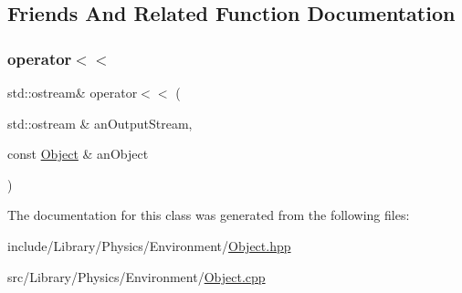 \subsection{Friends And Related Function Documentation}
\mbox{\label{classlibrary_1_1physics_1_1env_1_1_object_a418df9bf4a73078f3d494edef1743f8d}} 
\subsubsection{\texorpdfstring{operator$<$$<$}{operator<<}}
{\footnotesize\ttfamily std\+::ostream\& operator$<$$<$ (\begin{DoxyParamCaption}\item[{std\+::ostream \&}]{an\+Output\+Stream,  }\item[{const \hyperlink{classlibrary_1_1physics_1_1env_1_1_object}{Object} \&}]{an\+Object }\end{DoxyParamCaption})\hspace{0.3cm}{\ttfamily [friend]}}



The documentation for this class was generated from the following files\+:\begin{DoxyCompactItemize}
\item 
include/\+Library/\+Physics/\+Environment/\hyperlink{_object_8hpp}{Object.\+hpp}\item 
src/\+Library/\+Physics/\+Environment/\hyperlink{_object_8cpp}{Object.\+cpp}\end{DoxyCompactItemize}
